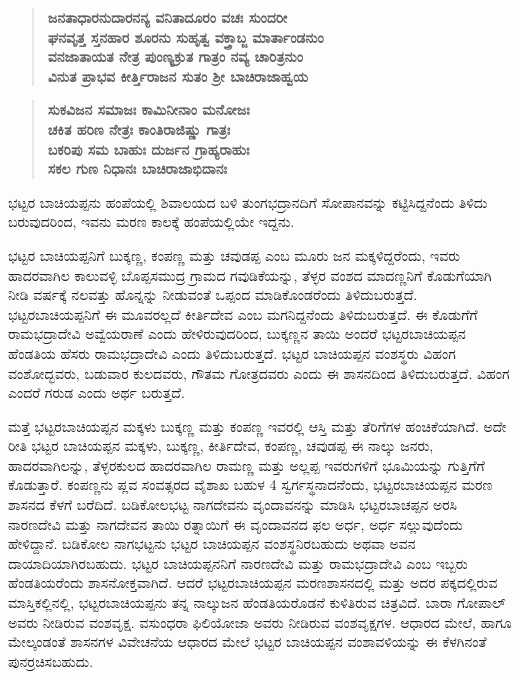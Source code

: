 \begin{verse}
\textbf{ಜನತಾಧಾರನುದಾರನನ್ಯ ವನಿತಾದೂರಂ ವಚಃ ಸುಂದರೀ} \\\textbf{ಘನವೃತ್ತ ಸ್ತನಹಾರ ಶೂರನು ಸುಹೃತ್ವ ವಕ್ತ್ರಾಬ್ಜ ಮಾರ್ತಾಂಡನುಂ} \\\textbf{ವನಜಾತಾಯತ ನೇತ್ರ ಪುಂಣ್ಯಕ್ರುತ ಗಾತ್ರಂ ನವ್ಯ ಚಾರಿತ್ರನುಂ} \\\textbf{ವಿನುತ ಪ್ರಾಭವ ಕೀರ್ತ್ತಿರಾಜನ ಸುತಂ ಶ‍್ರೀ ಬಾಚಿರಾಜಾಹ್ವಯ}
\end{verse}

\begin{verse}
\textbf{ಸುಕವಿಜನ ಸಮಾಜಃ ಕಾಮಿನೀನಾಂ ಮನೋಜಃ} \\\textbf{ಚಕಿತ ಹರಿಣ ನೇತ್ರಃ ಕಾಂತಿರಾಜಿಷ್ಣು ಗಾತ್ರಃ} \\\textbf{ಬಕರಿಪು ಸಮ ಬಾಹುಃ ದುರ್ಜನ ಗ್ರಾಹ್ಯರಾಹುಃ} \\\textbf{ಸಕಲ ಗುಣ ನಿಧಾನಃ ಬಾಚಿರಾಜಾಭಿದಾನಃ}
\end{verse}

ಭಟ್ಟರ ಬಾಚಿಯಪ್ಪನು ಹಂಪೆಯಲ್ಲಿ ಶಿವಾಲಯದ ಬಳಿ ತುಂಗಭದ್ರಾನದಿಗೆ ಸೋಪಾನವನ್ನು ಕಟ್ಟಿಸಿದ್ದನೆಂದು ತಿಳಿದು ಬರುವುದರಿಂದ, ಇವನು ಮರಣ ಕಾಲಕ್ಕೆ ಹಂಪೆಯಲ್ಲಿಯೇ ಇದ್ದನು.

ಭಟ್ಟರ ಬಾಚಿಯಪ್ಪನಿಗೆ ಬುಕ್ಕಣ್ಣ, ಕಂಪಣ್ಣ ಮತ್ತು ಚವುಡಪ್ಪ ಎಂಬ ಮೂರು ಜನ ಮಕ್ಕಳಿದ್ದರೆಂದು, ಇವರು ಹಾದರವಾಗಿಲ ಕಾಲುವಳ್ಳಿ ಬೊಪ್ಪಸಮುದ್ರ ಗ್ರಾಮದ ಗವುಡಿಕೆಯನ್ನು, ತೆಳ್ಳರ ವಂಶದ ಮಾದಣ್ಣನಿಗೆ ಕೊಡುಗೆಯಾಗಿ ನೀಡಿ ವರ್ಷಕ್ಕೆ ನಲವತ್ತು ಹೊನ್ನನ್ನು ನೀಡುವಂತೆ ಒಪ್ಪಂದ ಮಾಡಿಕೊಂಡರೆಂದು ತಿಳಿದುಬರುತ್ತದೆ. ಭಟ್ಟರಬಾಚಿಯಪ್ಪನಿಗೆ ಈ ಮೂವರಲ್ಲದೆ ಕೀರ್ತಿದೇವ ಎಂಬ ಮಗನಿದ್ದನೆಂದು ತಿಳಿದುಬರುತ್ತದೆ. ಈ ಕೊಡುಗೆಗೆ ರಾಮಭದ್ರಾದೇವಿ ಅವ್ವೆಯರಾಣೆ ಎಂದು ಹೇಳಿರುವುದರಿಂದ, ಬುಕ್ಕಣ್ಣನ ತಾಯಿ ಅಂದರೆ ಭಟ್ಟರಬಾಚಿಯಪ್ಪನ ಹೆಂಡತಿಯ ಹೆಸರು ರಾಮಭದ್ರಾದೇವಿ ಎಂದು ತಿಳಿದುಬರುತ್ತದೆ. ಭಟ್ಟರ ಬಾಚಿಯಪ್ಪನ ವಂಶಸ್ಥರು ವಿಹಂಗ ವಂಶೋದ್ಭವರು, ಬಡುವಾರ ಕುಲದವರು, ಗೌತಮ ಗೋತ್ರದವರು ಎಂದು ಈ ಶಾಸನದಿಂದ ತಿಳಿದುಬರುತ್ತದೆ. ವಿಹಂಗ ಎಂದರೆ ಗರುಡ ಎಂದು ಅರ್ಥ ಬರುತ್ತದೆ.

ಮತ್ತೆ ಭಟ್ಟರಬಾಚಿಯಪ್ಪನ ಮಕ್ಕಳು ಬುಕ್ಕಣ್ಣ ಮತ್ತು ಕಂಪಣ್ಣ ಇವರಲ್ಲಿ ಆಸ್ತಿ ಮತ್ತು ತೆರಿಗೆಗಳ ಹಂಚಿಕೆಯಾಗಿದೆ. ಅದೇ ರೀತಿ ಭಟ್ಟರ ಬಾಚಿಯಪ್ಪನ ಮಕ್ಕಳು, ಬುಕ್ಕಣ್ಣ, ಕೀರ್ತಿದೇವ, ಕಂಪಣ್ಣ, ಚವುಡಪ್ಪ ಈ ನಾಲ್ಕು ಜನರು, ಹಾದರವಾಗಿಲನ್ನು, ತೆಳ್ಳರಕುಲದ ಹಾದರವಾಗಿಲ ರಾಮಣ್ಣ ಮತ್ತು ಅಲ್ಲಪ್ಪ ಇವರುಗಳಿಗೆ ಭೂಮಿಯನ್ನು ಗುತ್ತಿಗೆಗೆ ಕೊಡುತ್ತಾರೆ. ಕಂಪಣ್ಣನು ಪ್ಲವ ಸಂವತ್ಸರದ ವೈಶಾಖ ಬಹುಳ 4 ಸ್ವರ್ಗಸ್ಥನಾದನೆಂದು, ಭಟ್ಟರಬಾಚಿಯಪ್ಪನ ಮರಣ ಶಾಸನದ ಕೆಳಗೆ ಬರೆದಿದೆ. ಬಡಿಕೋಲಭಟ್ಟ ನಾಗದೇವನು ವೃಂದಾವನನ್ನು ಮಾಡಿಸಿ ಭಟ್ಟರಬಾಚಪ್ಪನ ಅರಸಿ ನಾರಣದೇವಿ ಮತ್ತು ನಾಗದೇವನ ತಾಯಿ ರತ್ನಾಯಿಗೆ ಈ ವೃಂದಾವನದ ಫಲ ಅರ್ಧ, ಅರ್ಧ ಸಲ್ಲುವುದೆಂದು ಹೇಳಿದ್ದಾನೆ. ಬಡಿಕೋಲ ನಾಗಭಟ್ಟನು ಭಟ್ಟರ ಬಾಚಿಯಪ್ಪನ ವಂಶಸ್ಥನಿರಬಹುದು ಅಥವಾ ಅವನ ದಾಯಾದಿಯಾಗಿರಬಹುದು. ಭಟ್ಟರ ಬಾಚಿಯಪ್ಪನನಿಗೆ ನಾರಣದೇವಿ ಮತ್ತು ರಾಮಭದ್ರಾದೇವಿ ಎಂಬ ಇಬ್ಬರು ಹೆಂಡತಿಯರೆಂದು ಶಾಸನೋಕ್ತವಾಗಿದೆ. ಆದರೆ ಭಟ್ಟರಬಾಚಿಯಪ್ಪನ ಮರಣಶಾಸನದಲ್ಲಿ ಮತ್ತು ಅದರ ಪಕ್ಕದಲ್ಲಿರುವ ಮಾಸ್ತಿಕಲ್ಲಿನಲ್ಲಿ, ಭಟ್ಟರಬಾಚಿಯಪ್ಪನು ತನ್ನ ನಾಲ್ಕುಜನ ಹೆಂಡತಿಯರೊಡನೆ ಕುಳಿತಿರುವ ಚಿತ್ರವಿದೆ. ಬಾರಾ ಗೋಪಾಲ್​ ಅವರು ನೀಡಿರುವ ವಂಶವೃಕ್ಷ. ವಸುಂಧರಾ ಫಿಲಿಯೋಜಾ ಅವರು ನೀಡಿರುವ ವಂಶವೃಕ್ಷಗಳ. ಆಧಾರದ ಮೇಲೆ, ಹಾಗೂ ಮೇಲ್ಕಂಡಂತೆ ಶಾಸನಗಳ ವಿವೇಚನೆಯ ಆಧಾರದ ಮೇಲೆ ಭಟ್ಟರ ಬಾಚಿಯಪ್ಪನ ವಂಶಾವಳಿಯನ್ನು ಈ ಕೆಳಗಿನಂತೆ ಪುನರ್ರಚಿಸಬಹುದು.

